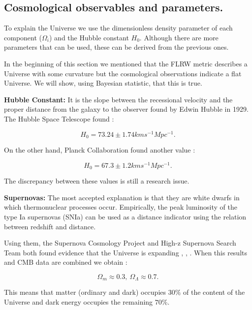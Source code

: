 \documentclass[onecolumn,           %
               showpacs,            %
               preprintnumbers,     %
               aps,                 %
               prl,          	    %
               letterpaper,             %
               superscriptaddress,      %
               nofootinbib,         %
               tightenlines,        %
               floats,floatfix      %
               ,usenatbib,
               ]{revtex4-1}
\begin{document}
\subsection{Cosmological observables and parameters.}
To explain the Universe we use the dimensionless density parameter of each component ($\Omega_i$) and the Hubble constant $H_0$. Although there are more parameters that can be used, these can be derived from the previous ones.

In the beginning of this section we mentioned that the FLRW metric describes a Universe with some curvature but the cosmological observations indicate a flat Universe. We will show, using Bayesian statistic, that this is true.

\textbf{Hubble Constant:} It is the slope between the recessional velocity and the proper distance from the galaxy to the observer found by Edwin Hubble in 1929. The Hubble Space Telescope found \cite{hubble2016}:

\begin{equation}
H_0 = 73.24 \pm 1.74 kms^{-1} Mpc^{-1}.
\end{equation}

On the other hand, Planck Collaboration found another value \cite{planck}:

\begin{equation}
H_0 = 67.3 \pm 1.2 kms^{-1} Mpc^{-1}.
\end{equation}

The discrepancy between these values ​​is still a research issue.

\textbf{Supernovas:} The most accepted explanation is that they are white dwarfs in which thermonuclear processes occur. Empirically, the peak luminosity of the type Ia supernovas (SNIa) can be used as a distance indicator using the relation between redshift and distance\cite{parametros}. 

Using them, the Supernova Cosmology Project and High-z Supernova Search Team both found evidence that the Universe is expanding \cite{supernova1}, \cite{supernova2}, \cite{supernova3}. When this results and CMB data are combined we obtain \cite{parametros}:

\begin{equation}
\Omega_m \approx 0.3, \ \Omega_{\Lambda} \approx 0.7 .
\end{equation}

This means that matter (ordinary and dark) occupies $30 \%$ of the content of the Universe and dark energy occupies the remaining $70 \%$. 
\end{document}
